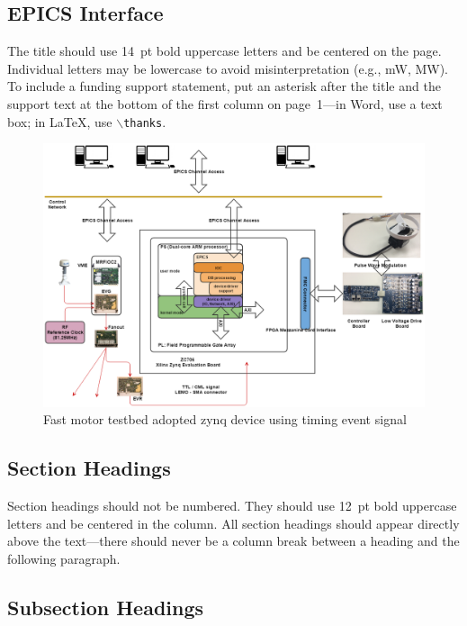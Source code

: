 \documentclass[a4paper,
              ]{jacow}
\begin{document}
\subsection{EPICS Interface}
The title should use \SI{14}{pt} bold uppercase letters and be centered on the page.
Individual letters may be lowercase to avoid misinterpretation (e.g., mW, MW).
To include a funding support statement, put an asterisk after the title and
the support text at the bottom of the first column on page~1---in Word,
use a text box; in \LaTeX, use $\backslash$\texttt{thanks}.





\begin{figure}[!tbh]
    \centering
    \includegraphics*[width=\textwidth,height=0.6\textwidth]{motor-testbed}
    \caption{Fast motor testbed adopted zynq device using timing event signal}
    \label{stepper}
\end{figure}



\subsection{Section Headings}

Section headings should not be numbered. They should
use  \SI{12}{pt}  bold  uppercase  letters  and  be  centered  in  the
column. All section headings should appear directly above
the text---there should never be a column break between a heading and the
following paragraph.

\subsection{Subsection Headings}
\end{document}
